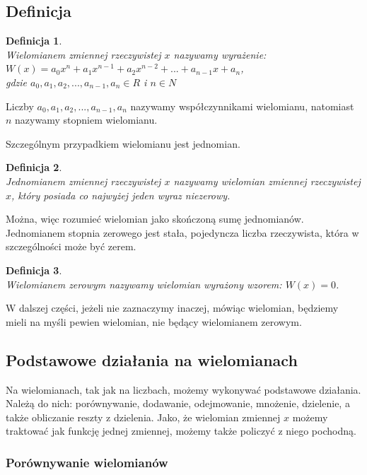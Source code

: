 \documentclass[twoside,a4paper]{book}
\newtheorem{definition}{Definicja}
\begin{document}
\subsection{Definicja}

\begin{definition}
	$ $\\
Wielomianem zmiennej rzeczywistej $x$ nazywamy wyrażenie: \\
$W(x) = a_0x^n + a_1x^{n-1} + a_2x^{n-2}+ ... + a_{n-1}x + a_n$, \\
gdzie $a_0, a_1, a_2, ..., a_{n-1}, a_n\in R$ i $n \in N$
\end{definition}

Liczby $a_0, a_1, a_2, ..., a_{n-1}, a_n$ nazywamy współczynnikami wielomianu, natomiast $n$ nazywamy stopniem wielomianu.
	
Szczególnym przypadkiem wielomianu jest jednomian. 

\begin{definition}
	$ $\\
	Jednomianem zmiennej rzeczywistej $x$ nazywamy wielomian zmiennej rzeczywistej $x$, który posiada co najwyżej jeden wyraz niezerowy.
\end{definition}

Można, więc rozumieć wielomian jako skończoną sumę jednomianów.
Jednomianem stopnia zerowego jest stała, pojedyncza liczba rzeczywista, która w szczególności może być zerem.

\begin{definition}
	$ $\\
	Wielomianem zerowym nazywamy wielomian wyrażony wzorem:	$W(x) = 0$.
\end{definition}

W dalszej części, jeżeli nie zaznaczymy inaczej, mówiąc wielomian, będziemy mieli na myśli pewien wielomian, nie będący wielomianem zerowym.

\subsection{Podstawowe działania na wielomianach}

Na wielomianach, tak jak na liczbach, możemy wykonywać podstawowe działania. Należą do nich: porównywanie, dodawanie, odejmowanie, mnożenie, dzielenie, a także obliczanie reszty z dzielenia. Jako, że wielomian zmiennej $x$ możemy traktować jak funkcję jednej zmiennej, możemy także policzyć z niego pochodną.

\subsubsection{Porównywanie wielomianów}
\end{document}
